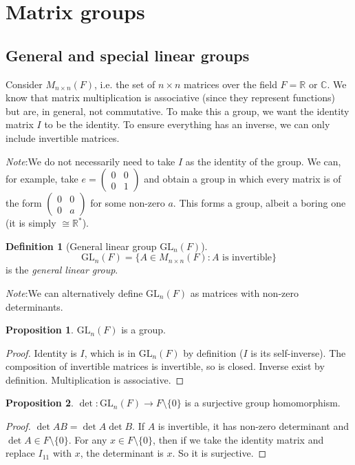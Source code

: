 \documentclass[a4paper]{article}
\theoremstyle{definition}
\newtheorem*{prop}{Proposition}
\newtheorem*{defi}{Definition}
\newcommand{\note}{\noindent \emph{Note}:\;}
\newcommand{\R}{\mathbb{R}}
\newcommand{\C}{\mathbb{C}}
\newcommand{\GL}{\mathrm{GL}}
\let\stdsection\section
\renewcommand\section{\newpage\stdsection}
\begin{document}
\section{Matrix groups}
\subsection{General and special linear groups}
Consider $M_{n\times n}(F)$, i.e. the set of $n\times n$ matrices over the field $F = \R$ or $\C$. We know that matrix multiplication is associative (since they represent functions) but are, in general, not commutative. To make this a group, we want the identity matrix $I$ to be the identity. To ensure everything has an inverse, we can only include invertible matrices.

\note We do not necessarily need to take $I$ as the identity of the group. We can, for example, take $e = 
\begin{pmatrix}
  0 & 0\\
  0 & 1
\end{pmatrix}$ and obtain a group in which every matrix is of the form $\begin{pmatrix}
  0 & 0\\
  0 & a
\end{pmatrix}$ for some non-zero $a$. This forms a group, albeit a boring one (it is simply $\cong \R^*$).
\begin{defi}[General linear group $\GL_n(F)$]
  \[
  \GL_n(F) = \{A\in M_{n\times n}(F) : A\text{ is invertible}\}
  \]
 is the \emph{general linear group}.
\end{defi}
\note We can alternatively define $\GL_n(F)$ as matrices with non-zero determinants.

\begin{prop}
  $\GL_n(F)$ is a group.
\end{prop}
\begin{proof}
  Identity is $I$, which is in $\GL_n(F)$ by definition ($I$ is its self-inverse). The composition of invertible matrices is invertible, so is closed. Inverse exist by definition. Multiplication is associative.
\end{proof}

\begin{prop}
  $\det: \GL_n(F) \to F\setminus\{0\}$ is a surjective group homomorphism.
\end{prop}

\begin{proof}
  $\det AB = \det A\det B$. If $A$ is invertible, it has non-zero determinant and $\det A\in F\setminus\{0\}$. For any $x\in F\setminus\{0\}$, then if we take the identity matrix and replace $I_{11}$ with $x$, the determinant is $x$. So it is surjective.
\end{proof}
\end{document}
